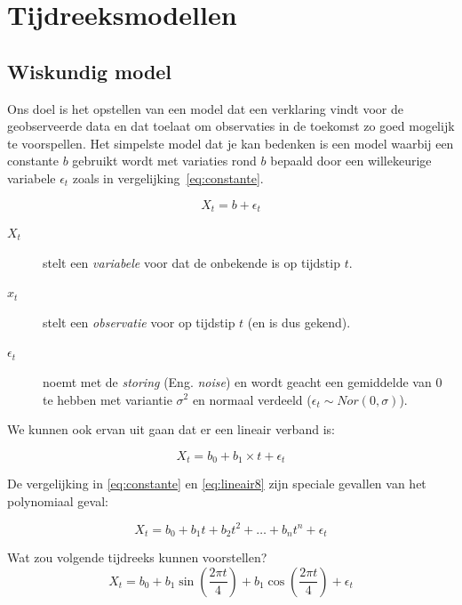 \section{Tijdreeksmodellen}

\subsection{Wiskundig model}

Ons doel is het opstellen van een model dat een verklaring vindt voor de geobserveerde data en dat toelaat om observaties in de toekomst zo goed mogelijk te voorspellen. Het simpelste model dat je kan bedenken is een model waarbij een constante $b$ gebruikt wordt met variaties rond $b$ bepaald door een willekeurige variabele $\epsilon_{t}$ zoals in vergelijking~\ref{eq:constante}. 

\begin{equation}
	X_{t} = b + \epsilon_{t}
\label{eq:constante}
\end{equation}

\begin{description}
  \item [$X_{t}$] stelt een \emph{variabele} voor dat de onbekende is op tijdstip $t$.
  \item [$x_{t}$] stelt een \emph{observatie} voor op tijdstip $t$ (en is dus gekend). 
  \item [$\epsilon_{t}$] noemt met de \emph{storing} (Eng. \emph{noise}) en wordt geacht een gemiddelde van $0$ te hebben met variantie $\sigma^{2}$ en normaal verdeeld ($\epsilon_{t} \sim Nor(0, \sigma)$). 
\end{description}

We kunnen ook ervan uit gaan dat er een lineair verband is:

\begin{equation}
X_{t} = b_{0} + b_{1} \times t + \epsilon_{t}
\label{eq:lineair8}
\end{equation}

De vergelijking in \ref{eq:constante} en \ref{eq:lineair8} zijn speciale gevallen van het polynomiaal geval:

\begin{equation}
	X_{t} = b_{0} + b_{1} t + b_{2} t^{2} + \dots + b_{n} t^{n} + \epsilon_{t} 
\label{eq:polynomiaal}
\end{equation}

\begin{exercise}
	Wat zou volgende tijdreeks kunnen voorstellen?
	\begin{equation}
		X_{t} = b_{0} + b_{1} \sin\left(\frac{2\pi t}{4}\right) + b_{1} \cos\left(\frac{2\pi t}{4}\right) + \epsilon_{t}
	\label{eq:seasonal}
\end{equation}
\end{exercise}

